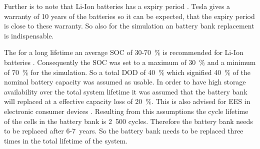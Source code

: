 Further is to note that Li-Ion batteries has a expiry period \cite{Jossen2006}. Tesla gives a warranty of 10 years of the batteries \cite{Shahan2015} so it can be expected, that the expiry period is close to these warranty. So also for the simulation an battery bank replacement is indispensable.



The for a long lifetime an average SOC of 30-70~\% is recommended for Li-Ion batteries \cite{Jossen2006}. Consequently the SOC was set to a maximum of 30~\% and a minimum of 70~\% for the simulation. So a total DOD of 40~\% which signified 40~\% of the nominal battery capacity was assumed as usable. In order to have high storage availability over the total system lifetime it was assumed that the battery bank will replaced at a effective capacity loss of 20~\%. This is also advised for EES in electronic consumer devices \cite{Spotnitz2003}. Resulting from this assumptions the cycle lifetime of the cells in the battery bank is 2~500 cycles. Therefore the battery bank needs to be replaced after 6-7~years. So the battery bank needs to be replaced three times in the total lifetime of the system. 



